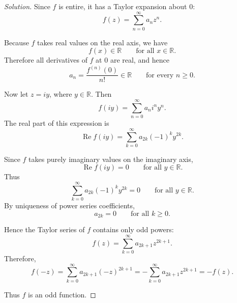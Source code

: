 \documentclass[12pt, a4paper]{report}
\theoremstyle{spaced}
\begin{document}
\begin{proof}[Solution]
	Since \(f\) is entire, it has a Taylor expansion about \(0\):
	\[
		f(z)=\sum_{n=0}^{\infty} a_n z^n.
	\]

	Because \(f\) takes real values on the real axis, we have
	\[
		f(x)\in \mathbb{R}
		\qquad \text{for all } x\in \mathbb{R}.
	\]
	Therefore all derivatives of \(f\) at \(0\) are real, and hence
	\[
		a_n=\frac{f^{(n)}(0)}{n!}\in \mathbb{R}
		\qquad \text{for every } n\geq 0.
	\]

	Now let \(z=iy\), where \(y\in\mathbb{R}\). Then
	\[
		f(iy)=\sum_{n=0}^{\infty} a_n i^n y^n.
	\]
	The real part of this expression is
	\[
		\operatorname{Re} f(iy)
		=
		\sum_{k=0}^{\infty} a_{2k}(-1)^k y^{2k}.
	\]

	Since \(f\) takes purely imaginary values on the imaginary axis,
	\[
		\operatorname{Re} f(iy)=0
		\qquad \text{for all } y\in\mathbb{R}.
	\]
	Thus
	\[
		\sum_{k=0}^{\infty} a_{2k}(-1)^k y^{2k}=0
		\qquad \text{for all } y\in\mathbb{R}.
	\]
	By uniqueness of power series coefficients,
	\[
		a_{2k}=0
		\qquad \text{for all } k\geq 0.
	\]

	Hence the Taylor series of \(f\) contains only odd powers:
	\[
		f(z)=\sum_{k=0}^{\infty} a_{2k+1}z^{2k+1}.
	\]
	Therefore,
	\[
		f(-z)
		=
		\sum_{k=0}^{\infty} a_{2k+1}(-z)^{2k+1}
		=
		-\sum_{k=0}^{\infty} a_{2k+1}z^{2k+1}
		=
		-f(z).
	\]

	Thus \(f\) is an odd function.
\end{proof}
\end{document}
